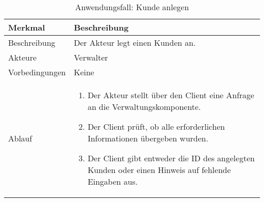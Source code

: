 \begin{table}[H]
    \centering
    \caption{Anwendungsfall: Kunde anlegen}
    \label{tab:use_case_add_customer}
    \begin{tabularx}{\textwidth}{lX}
        \toprule
        \textbf{Merkmal} & \textbf{Beschreibung}  \\ \midrule
        Beschreibung    & Der Akteur legt einen Kunden an. \\
        Akteure         & Verwalter \\
        Vorbedingungen  & Keine \\
        Ablauf          & \begin{minipage}[t]{\linewidth}
        \vspace*{-3mm}
        \begin{enumerate}[leftmargin=*,nosep,after=\strut]
            \item Der Akteur stellt über den Client eine Anfrage an die Verwaltungskomponente.
            \item Der Client prüft, ob alle erforderlichen Informationen übergeben wurden.
            \item Der Client gibt entweder die ID des angelegten Kunden oder einen Hinweis auf fehlende Eingaben aus.
        \end{enumerate}
        \end{minipage} \\\bottomrule
    \end{tabularx}    
\setlength\belowcaptionskip{4pt}
\end{table}
